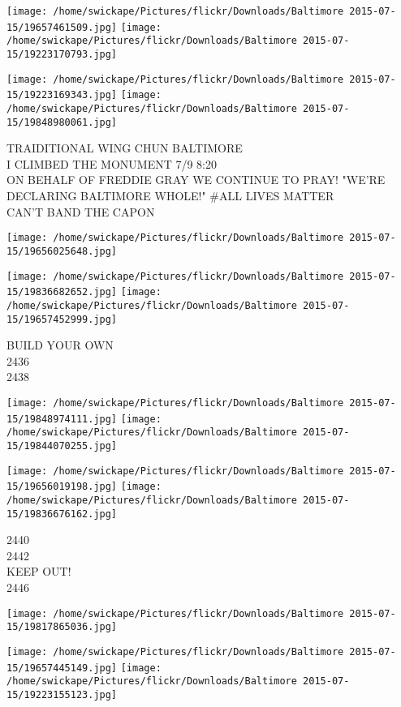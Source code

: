 \documentclass[10pt,letterpaper]{article}
\begin{document}
\texttt{[image: /home/swickape/Pictures/flickr/Downloads/Baltimore 2015-07-15/19657461509.jpg]}
\texttt{[image: /home/swickape/Pictures/flickr/Downloads/Baltimore 2015-07-15/19223170793.jpg]}

\texttt{[image: /home/swickape/Pictures/flickr/Downloads/Baltimore 2015-07-15/19223169343.jpg]}
\texttt{[image: /home/swickape/Pictures/flickr/Downloads/Baltimore 2015-07-15/19848980061.jpg]}

TRAIDITIONAL WING CHUN BALTIMORE\\
I CLIMBED THE MONUMENT 7/9 8:20\\
ON BEHALF OF FREDDIE GRAY WE CONTINUE TO PRAY!  "WE'RE DECLARING BALTIMORE WHOLE!"  \#ALL LIVES MATTER\\
CAN'T BAND THE CAPON\\
\pagebreak

\texttt{[image: /home/swickape/Pictures/flickr/Downloads/Baltimore 2015-07-15/19656025648.jpg]}

\vspace{0.25in}
\texttt{[image: /home/swickape/Pictures/flickr/Downloads/Baltimore 2015-07-15/19836682652.jpg]}
\texttt{[image: /home/swickape/Pictures/flickr/Downloads/Baltimore 2015-07-15/19657452999.jpg]}

BUILD YOUR OWN\\
2436\\
2438\\
\pagebreak

\texttt{[image: /home/swickape/Pictures/flickr/Downloads/Baltimore 2015-07-15/19848974111.jpg]}
\texttt{[image: /home/swickape/Pictures/flickr/Downloads/Baltimore 2015-07-15/19844070255.jpg]}

\texttt{[image: /home/swickape/Pictures/flickr/Downloads/Baltimore 2015-07-15/19656019198.jpg]}
\texttt{[image: /home/swickape/Pictures/flickr/Downloads/Baltimore 2015-07-15/19836676162.jpg]}

2440\\
2442\\
KEEP OUT!\\
2446\\
\pagebreak

\texttt{[image: /home/swickape/Pictures/flickr/Downloads/Baltimore 2015-07-15/19817865036.jpg]}

\vspace{0.25in}
\texttt{[image: /home/swickape/Pictures/flickr/Downloads/Baltimore 2015-07-15/19657445149.jpg]}
\texttt{[image: /home/swickape/Pictures/flickr/Downloads/Baltimore 2015-07-15/19223155123.jpg]}
\end{document}
